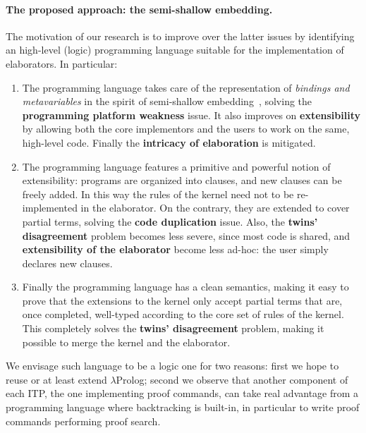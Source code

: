 \documentclass{easychair}
\begin{document}
\paragraph{The proposed approach: the semi-shallow embedding.}

The motivation of our research is to improve over the latter issues by
identifying an high-level (logic) programming language suitable for
the implementation of elaborators. In particular:
\begin{enumerate}
\item The programming language takes care of the representation of
	\emph{bindings and metavariables} in the spirit of semi-shallow embedding~\cite{holsuperlight},
	solving the \textbf{programming platform weakness} issue.
	It also improves on \textbf{extensibility} by allowing
	both the core implementors and the users to work on the same,
	high-level code.
	Finally the \textbf{intricacy of elaboration} is mitigated.
\item The programming language features a primitive and powerful
	notion of extensibility: programs are organized into clauses,
	and new clauses can be freely added.
	In this way the rules of the kernel need not to be re-implemented in the
	elaborator. On the contrary, they are extended to cover partial terms,
	solving the \textbf{code duplication} issue.
	Also, the \textbf{twins' disagreement} problem becomes less severe,
	since most code is shared, and
	\textbf{extensibility of the elaborator}
	become less ad-hoc: the user simply declares new clauses.
\item Finally the programming language has a clean semantics, making it
	easy to prove that the extensions to the kernel
	only accept partial terms that are, once completed,
	well-typed according
	to the core set of rules of the kernel.  This completely
	solves the \textbf{twins' disagreement} problem, making it possible to
	merge the kernel and the elaborator.
\end{enumerate}

We envisage such language to be a logic one for two reasons:
first we hope to reuse or at least extend $\lambda$Prolog;
second we observe that another component of each ITP, the one
implementing proof commands, can take real advantage from a 
programming language where backtracking is built-in, in
particular to write proof commands performing proof search.
\end{document}
